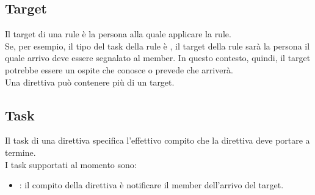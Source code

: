 \subsection{Target}
Il target di una rule è la persona alla quale applicare la rule. \\
Se, per esempio, il tipo del task della rule è , il target della rule sarà la persona il quale arrivo deve essere segnalato al member. In questo contesto, quindi, il target potrebbe essere un ospite che \PROPONENTE{} conosce o prevede che arriverà.\\
Una direttiva può contenere più di un target.
\subsection{Task}\label{task}
Il task di una direttiva specifica l'effettivo compito che la direttiva deve portare a termine.\\
I task supportati al momento sono:
\begin{itemize}
	\item {}: il compito della direttiva è notificare il member dell'arrivo del target.
\end{itemize}